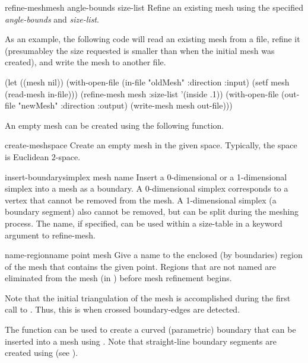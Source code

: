 \begin{functiondef}{refine-mesh}{mesh \key angle-bounds size-list}
Refine an existing mesh using the specified {\em angle-bounds} and
{\em size-list}.
\end{functiondef}

As an example, the following code will read an existing mesh from a
file, refine it (presumabley the size requested is smaller than when
the initial mesh was created), and write the mesh to another file.

\begin{code}
(let ((mesh nil))
  (with-open-file (in-file "oldMesh" :direction :input)
    (setf mesh (read-mesh in-file)))
  (refine-mesh mesh :size-list '(inside .1))
  (with-open-file (out-file "newMesh" :direction :output)
    (write-mesh mesh out-file)))
\end{code}

An empty mesh can be created using the following function.

\begin{functiondef}{create-mesh}{space}
Create an empty mesh in the given space.  Typically, the space is
Euclidean $2$-space.
\end{functiondef}

\begin{methoddef}{insert-boundary}{simplex mesh \key name}
Insert a 0-dimensional or a 1-dimensional simplex into a mesh as a
boundary.  A 0-dimensional simplex corresponds to a vertex that cannot
be removed from the mesh.  A 1-dimensional simplex (a boundary
segment) also cannot be removed, but can be split during the meshing
process.  The name, if specified, can be used within a size-table in a
keyword argument to {\sf refine-mesh}.
\end{methoddef}

\begin{functiondef}{name-region}{name point mesh}
Give a name to the enclosed (by boundaries) region of the mesh that
contains the given point.  Regions that are not named are eliminated
from the mesh (in ) before mesh refinement begins.
\end{functiondef}

Note that the initial triangulation of the mesh is accomplished during
the first call to .  Thus, this is when crossed
boundary-edges are detected.

The function  can be used to create a
curved (parametric) boundary that can be inserted into a mesh using
.  Note that straight-line boundary segments
are created using  (see
).

